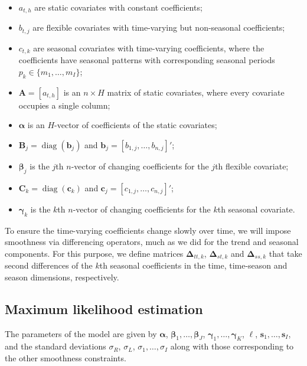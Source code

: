 \documentclass[11pt,a4paper,]{article}
\providecommand{\tightlist}{%
  \setlength{\itemsep}{0pt}\setlength{\parskip}{0pt}}
\begin{document}
\begin{itemize}
\tightlist
\item
  \(a_{t,h}\) are static covariates with constant coefficients;
\item
  \(b_{t,j}\) are flexible covariates with time-varying but non-seasonal coefficients;
\item
  \(c_{t,k}\) are seasonal covariates with time-varying coefficients, where the coefficients have seasonal patterns with corresponding seasonal periods \(p_k \in \{m_1,\dots,m_I\}\);
\item
  \(\bm{A} = [a_{t,h}]\) is an \(n \times H\) matrix of static covariates, where every covariate occupies a single column;
\item
  \(\bm{\alpha}\) is an \(H\)-vector of coefficients of the static covariates;
\item
  \(\bm{B}_j = \operatorname{diag}(\bm{b}_j)\) and \(\bm{b}_j = [b_{1,j},\dots,b_{n,j}]'\);
\item
  \(\bm{\beta}_j\) is the \(j\)th \(n\)-vector of changing coefficients for the \(j\)th flexible covariate;
\item
  \(\bm{C}_k = \operatorname{diag}(\bm{c}_k)\) and \(\bm{c}_j = [c_{1,j},\dots,c_{n,j}]'\);
\item
  \(\bm{\gamma}_k\) is the \(k\)th \(n\)-vector of changing coefficients for the \(k\)th seasonal covariate.
\end{itemize}

To ensure the time-varying coefficients change slowly over time, we will impose smoothness via differencing operators, much as we did for the trend and seasonal components. For this purpose, we define matrices \(\bm{\Delta}_{tt,k}\), \(\bm{\Delta}_{st,k}\) and \(\bm{\Delta}_{ss,k}\) that take second differences of the \(k\)th seasonal coefficients in the time, time-season and season dimensions, respectively.

\hypertarget{maximum-likelihood-estimation}{%
\subsection{Maximum likelihood estimation}\label{maximum-likelihood-estimation}}

\label{sec:STR_solution}

The parameters of the model are given by \(\bm{\alpha}\), \(\bm{\beta}_1,\dots,\bm{\beta}_J\), \(\bm{\gamma}_1,\dots,\bm{\gamma}_K\), \(\bm{\ell}\), \(\bm{s}_1,\dots,\bm{s}_I\), and the standard deviations \(\sigma_R\), \(\sigma_L\), \(\sigma_1,\dots,\sigma_I\) along with those corresponding to the other smoothness constraints.
\end{document}
